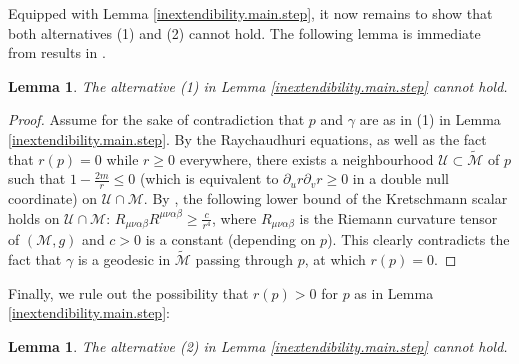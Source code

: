 \documentclass[10pt, reqno]{amsart}
\newtheorem{lemma}[theorem]{Lemma}
\theoremstyle{definition}
\theoremstyle{remark}
\numberwithin{equation}{section}
\newcommand{\rd}{\partial}
\newcommand{\0}{\emptyset}
\newcommand{\calM}{\mathcal M}
\newcommand{\calU}{\mathcal U}
\newcommand{\f}{\frac}
\begin{document}
Equipped with Lemma \ref{inextendibility.main.step}, it now remains to show that both alternatives (1) and (2) cannot hold. The following lemma is immediate from results in \cite{Kommemi}.
\begin{lemma}\label{not.at.S}
The alternative (1) in Lemma \ref{inextendibility.main.step} cannot hold.
\end{lemma}
\begin{proof}
Assume for the sake of contradiction that $p$ and $\gamma$ are as in (1) in Lemma \ref{inextendibility.main.step}. 
By the Raychaudhuri equations, as well as the fact that $r(p) = 0$ while $r \geq 0$ everywhere, there exists a neighbourhood $\calU \subset \widetilde{\calM}$ of $p$ such that $1 - \frac{2m}{r} \leq 0$ (which is equivalent to $\rd_{u} r \rd_{v} r \geq 0$ in a double null coordinate) on $\calU \cap \calM$. By \cite[Section~5.8]{Kommemi}, the following lower bound of the Kretschmann scalar holds on $\calU \cap \calM$: $R_{\mu\nu\alpha\beta}R^{\mu\nu\alpha\beta}\geq \f{c}{r^4}$, where $R_{\mu\nu\alpha\beta}$ is the Riemann curvature tensor of $(\mathcal M,g)$ and $c>0$ is a constant (depending on $p$). This clearly contradicts the fact that $\gamma$ is a geodesic in $\widetilde{\mathcal M}$ passing through $p$, at which $r(p) = 0$.
\end{proof}
Finally, we rule out the possibility that $r(p)>0$ for $p$ as in Lemma \ref{inextendibility.main.step}:
\begin{lemma}\label{not.at.CH}
The alternative (2) in Lemma \ref{inextendibility.main.step} cannot hold.
\end{lemma}
\end{document}
